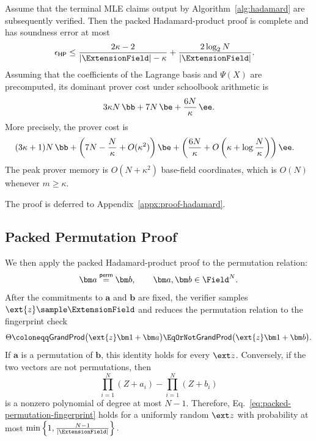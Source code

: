 \begin{proposition}
\label{proposition:hadamard-complexity}
Assume that the terminal MLE claims output by
Algorithm~\ref{alg:hadamard} are subsequently verified. Then the
packed Hadamard-product proof is complete and has soundness error
at most
\[
\begin{aligned}
    \epsilon_{\mathsf{HP}}
    &\leq
    \frac{2\kappa-2}
         {|\ExtensionField|-\kappa}
    +
    \frac{2\log_2N}
         {|\ExtensionField|}.
\end{aligned}
\]
Assuming that the coefficients of the Lagrange basis and
\(\Psi(X)\) are precomputed, its dominant prover cost under
schoolbook arithmetic is
\[
    3\kappa N\,\bb
    +
    7N\,\be
    +
    \frac{6N}{\kappa}\,\ee.
\]
More precisely, the prover cost is
\[
\begin{aligned}
    &(3\kappa+1)N\,\bb+
    \left(
        7N-\frac{N}{\kappa}
        +O(\kappa^2)
    \right)\be+
    \left(
        \frac{6N}{\kappa}
        +
        O\left(
            \kappa+\log\frac{N}{\kappa}
        \right)
    \right)\ee.
\end{aligned}
\]
The peak prover memory is \(O(N+\kappa^2)\) base-field
coordinates, which is \(O(N)\) whenever \(m\geq\kappa\).
\end{proposition}

The proof is deferred to Appendix~\ref{appx:proof-hadamard}.

\subsection{Packed Permutation Proof}
\label{sec:permutation}

We then apply the packed Hadamard-product proof to the permutation
relation:
\[
    \bm a\stackrel{\mathsf{perm}}{=}\bm b,
    \qquad
    \bm a,\bm b\in\Field^N.
\]
After the commitments to \(\bm a\) and \(\bm b\) are fixed, the
verifier samples
\(
    \ext{z}\sample\ExtensionField
\)
and reduces the permutation relation to the fingerprint check
\begin{equation}
   \Theta \coloneqq  \mathsf{GrandProd}
    \bigl(\ext{z}\bm 1+\bm a\bigr)
    \EqOrNot
    \mathsf{GrandProd}
    \bigl(\ext{z}\bm 1+\bm b\bigr).
\label{eq:packed-permutation-fingerprint}
\end{equation}
If \(\bm a\) is a permutation of \(\bm b\), this identity holds
for every \(\ext z\). Conversely, if the two vectors are not
permutations, then
\[
    \prod_{i=1}^{N}(Z+a_i)
    -
    \prod_{i=1}^{N}(Z+b_i)
\]
is a nonzero polynomial of degree at most \(N-1\). Therefore,
Eq.~\eqref{eq:packed-permutation-fingerprint} holds for a
uniformly random \(\ext z\) with probability at most
\(
    \min\left\{
        1,\frac{N-1}{|\ExtensionField|}
    \right\}.
\)


